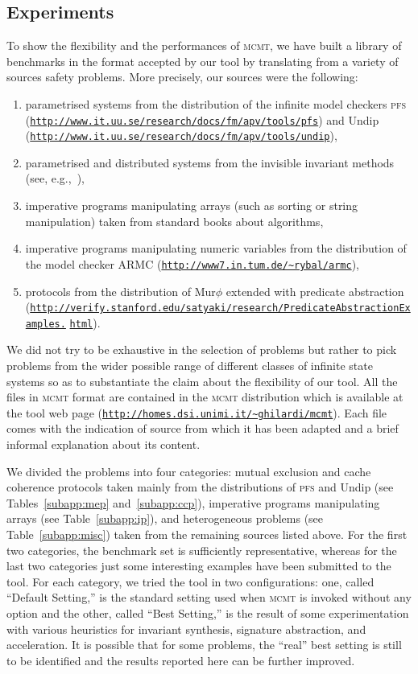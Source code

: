 \documentclass{LMCS}
\theoremstyle{plain}\newtheorem{assumption}[thm]{Assumption}
\theoremstyle{plain}\newtheorem{proposition}[thm]{Proposition}
\theoremstyle{plain}\newtheorem{property}[thm]{Property}
\theoremstyle{plain}\newtheorem{example}[thm]{Example}
\theoremstyle{plain}\newtheorem{claim}[thm]{Claim}
\theoremstyle{plain}\newtheorem{lemma}[thm]{Lemma}
\begin{document}
\subsection{Experiments}
\label{sec:exp}
To show the flexibility and the performances of \textsc{mcmt}, we have
built a library of benchmarks in the format accepted by our tool by
translating from a variety of sources safety problems.  More
precisely, our sources were the following:
\begin{enumerate}[$\bullet$]
\item parametrised systems from the distribution of the infinite model
  checkers \textsc{pfs}
  (\texttt{\url{http://www.it.uu.se/research/docs/fm/apv/tools/pfs}})
  and Undip
  (\texttt{\url{http://www.it.uu.se/research/docs/fm/apv/tools/undip}}),
\item parametrised and distributed systems from the invisible
  invariant methods (see, e.g.,~\cite{BFPZ05}),
\item imperative programs manipulating arrays (such as sorting or
  string manipulation) taken from standard books about algorithms,
\item imperative programs manipulating numeric variables from the
  distribution of the model checker ARMC
  (\texttt{\url{http://www7.in.tum.de/~rybal/armc}}),
\item protocols from the distribution of Mur$\phi$ extended with
  predicate abstraction
  (\texttt{\url{http://verify.stanford.edu/satyaki/research/PredicateAbstractionExamples.}} \linebreak \texttt{\url{html}}).
\end{enumerate}
We did not try to be exhaustive in the selection of problems but
rather to pick problems from the wider possible range of different
classes of infinite state systems so as to substantiate the claim
about the flexibility of our tool.  All the files in \textsc{mcmt}
format are contained in the \textsc{mcmt} distribution which is
available at the tool web page
(\texttt{\url{http://homes.dsi.unimi.it/~ghilardi/mcmt}}).  Each file
comes with the indication of source from which it has been adapted and
a brief informal explanation about its content.

We divided the problems into four categories: mutual exclusion and
cache coherence protocols taken mainly from the distributions of
\textsc{pfs} and Undip (see Tables~\ref{subapp:mep}
and~\ref{subapp:ccp}), imperative programs manipulating arrays (see
Table~\ref{subapp:ip}), and heterogeneous problems (see
Table~\ref{subapp:misc}) taken from the remaining sources listed
above.
For the first two categories, the benchmark set is sufficiently
representative, whereas for the last two categories just some
interesting examples have been submitted to the tool.
For each category, we tried the tool in two configurations: one,
called ``Default Setting,'' is the standard setting used when
\textsc{mcmt} is invoked without any option and the other, called
``Best Setting,'' is the result of some experimentation with various
heuristics for invariant synthesis, signature abstraction, and
acceleration.  It is possible that for some problems, the ``real''
best setting is still to be identified and the results reported here
can be further improved.
\end{document}
